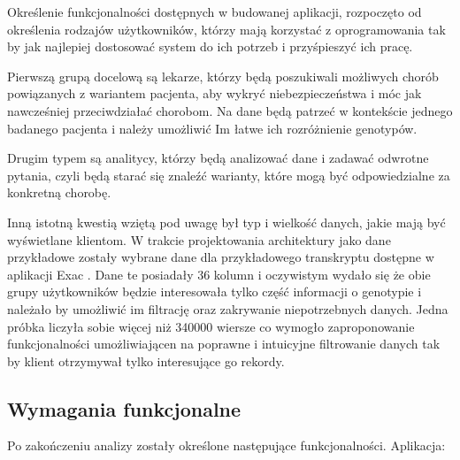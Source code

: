 \documentclass[a4paper,12pt,twoside]{article}
\begin{document}

Określenie funkcjonalności dostępnych w budowanej aplikacji, rozpoczęto od określenia 
rodzajów użytkowników, którzy mają korzystać z oprogramowania tak by jak najlepiej dostosować
system do ich potrzeb i przyśpieszyć ich pracę.

Pierwszą grupą docelową są lekarze, którzy będą poszukiwali
możliwych chorób powiązanych z wariantem pacjenta, aby wykryć niebezpieczeństwa
i móc jak nawcześniej przeciwdziałać chorobom. 
Na dane będą patrzeć w kontekście jednego badanego pacjenta i należy umożliwić Im łatwe 
ich rozróżnienie genotypów. 

Drugim typem są analitycy, którzy będą analizować dane i zadawać 
odwrotne pytania, czyli będą starać się znaleźć warianty, które mogą być odpowiedzialne
za konkretną chorobę. 

Inną istotną kwestią wziętą pod uwagę był typ i wielkość danych, jakie mają być wyświetlane klientom.
W trakcie projektowania architektury jako dane przykładowe zostały wybrane dane dla przykładowego transkryptu dostępne w aplikacji Exac \cite{exac}. Dane te posiadały 36 kolumn i oczywistym wydało się że obie grupy użytkowników będzie interesowała tylko część informacji o genotypie i należało by umożliwić im filtrację oraz zakrywanie niepotrzebnych danych. 
Jedna próbka liczyła sobie więcej niż 340000 wiersze co wymogło zaproponowanie 
funkcjonalności umożliwiającen na poprawne i intuicyjne filtrowanie danych 
tak by klient otrzymywał tylko interesujące go rekordy.

\subsection{Wymagania funkcjonalne}
Po zakończeniu analizy zostały określone następujące funkcjonalności. Aplikacja:
\end{document}
